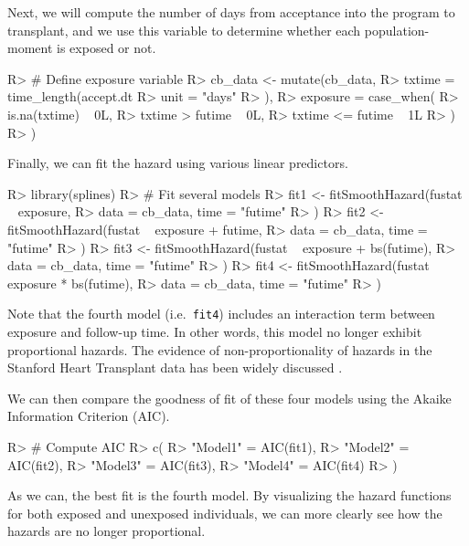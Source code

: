 \documentclass[
]{jss}
\begin{document}
Next, we will compute the number of days from acceptance into the
program to transplant, and we use this variable to determine whether
each population-moment is exposed or not.

\begin{CodeChunk}

\begin{CodeInput}
R> # Define exposure variable
R> cb_data <- mutate(cb_data,
R>   txtime = time_length(accept.dt %
R>     unit = "days"
R>   ),
R>   exposure = case_when(
R>     is.na(txtime) ~ 0L,
R>     txtime > futime ~ 0L,
R>     txtime <= futime ~ 1L
R>   )
R> )
\end{CodeInput}
\end{CodeChunk}

Finally, we can fit the hazard using various linear predictors.

\begin{CodeChunk}

\begin{CodeInput}
R> library(splines)
R> # Fit several models
R> fit1 <- fitSmoothHazard(fustat ~ exposure,
R>   data = cb_data, time = "futime"
R> )
R> fit2 <- fitSmoothHazard(fustat ~ exposure + futime,
R>   data = cb_data, time = "futime"
R> )
R> fit3 <- fitSmoothHazard(fustat ~ exposure + bs(futime),
R>   data = cb_data, time = "futime"
R> )
R> fit4 <- fitSmoothHazard(fustat ~ exposure * bs(futime),
R>   data = cb_data, time = "futime"
R> )
\end{CodeInput}
\end{CodeChunk}

Note that the fourth model (i.e.~\texttt{fit4}) includes an interaction
term between exposure and follow-up time. In other words, this model no
longer exhibit proportional hazards. The evidence of non-proportionality
of hazards in the Stanford Heart Transplant data has been widely
discussed \citep{arjas1988graphical}.

We can then compare the goodness of fit of these four models using the
Akaike Information Criterion (AIC).

\begin{CodeChunk}

\begin{CodeInput}
R> # Compute AIC
R> c(
R>   "Model1" = AIC(fit1),
R>   "Model2" = AIC(fit2),
R>   "Model3" = AIC(fit3),
R>   "Model4" = AIC(fit4)
R> )
\end{CodeInput}
\end{CodeChunk}

As we can, the best fit is the fourth model. By visualizing the hazard
functions for both exposed and unexposed individuals, we can more
clearly see how the hazards are no longer proportional.
\end{document}
